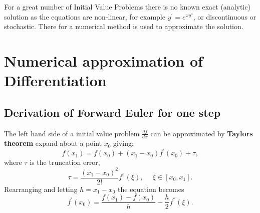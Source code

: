 For a great number of Initial Value Problems there is no known exact (analytic) solution as the equations are non-linear, for example
$y^{'} = e^{xy^4}$, or discontinuous or stochastic. There for a numerical method is used to approximate the solution.  

\section{Numerical approximation of Differentiation}
\subsection{Derivation of Forward Euler for one step}
The left hand side of a initial value problem $\frac{df}{dx}$ can be approximated by  \textbf{Taylors theorem} expand about a point $x_0$ giving:
\begin{equation}f(x_1) = f(x_0)+(x_1-x_0)f^{'}(x_0) + \tau, \end{equation}
where $\tau$ is the truncation error,
\begin{equation}\tau = \frac{(x_1-x_0)^2}{2!}f^{''}(\xi), \ \ \ \ \ \ \xi \in [x_0,x_1]. \end{equation}
Rearranging and letting $h=x_1-x_0$ the equation becomes
\[f^{'}(x_0)=\frac{f(x_1)-f(x_0)}{h}-\frac{h}{2}f^{''}(\xi). \]

